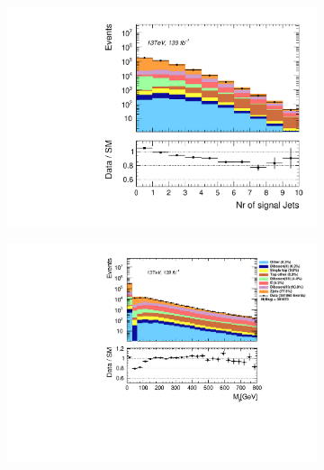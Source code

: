 \begin{figure}[H]
{\begin{subfigure}{.405\textwidth}
        \includegraphics[width=\textwidth]{Figures/FeaturesHistograms/njet_SG.pdf}
        \caption{}
        \label{fig:njet_SG}
    \end{subfigure}
    \hfill
    \begin{subfigure}{.525\textwidth}
        \includegraphics[width=\textwidth]{Figures/FeaturesHistograms/M_jj.pdf}
        \caption{}
        \label{fig:M_jj}
    \end{subfigure}
    }
\end{figure}
